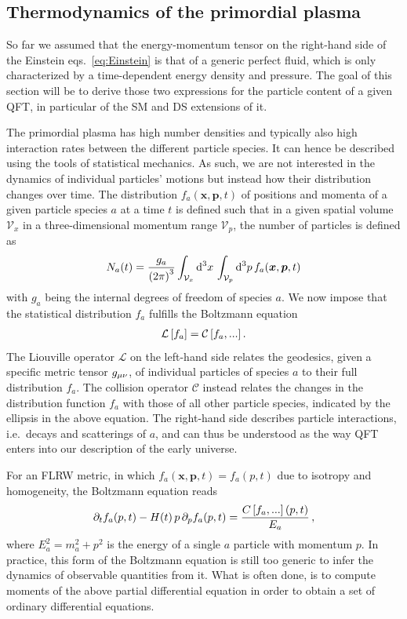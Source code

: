 \subsection{Thermodynamics of the primordial plasma} \label{sec:particlethermodynamics}

So far we assumed that the energy-momentum tensor on the right-hand side of the Einstein eqs.~\eqref{eq:Einstein} is that  of a generic perfect fluid, which is only characterized by a time-dependent energy density and pressure. The goal of this section will be to derive those two expressions for the particle content of a given \ac{QFT}, in particular of the \ac{SM} and \ac{DS} extensions of it.

The primordial plasma has high number densities and typically also high interaction rates between the different particle species. It can hence be described using the tools of statistical mechanics. As such, we are not interested in the dynamics of individual particles' motions but instead how their distribution changes over time. The distribution $f_a(\bm{x},\bm{p},t)$ of positions and momenta of a given particle species $a$ at a time $t$ is defined such that in a given spatial volume $\mathcal{V}_x$ in a three-dimensional momentum range $\mathcal{V}_p$, the number of particles is defined as
\begin{align}
	N_a(t) = \frac{g_a}{\left( 2 \pi \right)^3}\int_{\mathcal{V}_x} \mathop{}\!\mathrm{d}^3 x \, \int_{\mathcal{V}_p} \mathop{}\!\mathrm{d}^3 p \, f_a(\bm{x},\bm{p}, t)
\end{align}
with $g_a$ being the   internal degrees of freedom of species $a$. We now impose that the statistical distribution $f_a$ fulfills the Boltzmann equation
\begin{align}
	\mathcal{L}\left[ f_a \right] = \mathcal{C}\left[ f_a, ... \right] .
	\label{eq:Boltzmann}
\end{align}
The Liouville operator $\mathcal{L}$ on the left-hand side relates the geodesics, given a specific metric tensor $g_{{\mu \nu}}$, of individual particles of species $a$ to their full distribution $f_a$. The collision operator $\mathcal{C}$ instead relates the changes in the distribution function $f_a$ with those of all other particle species, indicated by the ellipsis in the above equation. The right-hand side describes particle interactions, i.e.~decays and scatterings of $a$, and can thus be understood as the way \ac{QFT} enters into our description of the early universe. 

For an \ac{FLRW} metric, in which $f_a(\bm{x}, \bm{p},t) = f_a(p,t)$ due to isotropy and homogeneity, the Boltzmann equation reads
\begin{align}
	\partial_t f_a(p,t) - H(t) \, p \, \partial_p f_a(p,t) = \frac{C\left[ f_a, ... \right](p,t)}{E_a} \, ,
	\label{eq:BoltzmannFLRW}
\end{align}
where $E_a^2 = m_a^2 + p^2$ is the energy of a single $a$ particle with momentum $p$. In practice, this form of the Boltzmann equation is still too generic to infer the dynamics of observable quantities from it. What is often done, is to compute moments of the above partial differential equation in order to obtain a set of ordinary differential equations.

